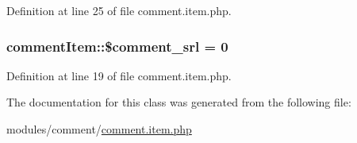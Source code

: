 Definition at line 25 of file comment.\-item.\-php.

\hypertarget{classcommentItem_aec6b057a6e1e71a7b1441fe12682af3b}{
\subsubsection[{\$comment\-\_\-srl}]{\setlength{\rightskip}{0pt plus 5cm}comment\-Item\-::\$comment\-\_\-srl = 0}}\label{classcommentItem_aec6b057a6e1e71a7b1441fe12682af3b}


Definition at line 19 of file comment.\-item.\-php.



The documentation for this class was generated from the following file\-:\begin{DoxyCompactItemize}
\item 
modules/comment/\hyperlink{comment_8item_8php}{comment.\-item.\-php}\end{DoxyCompactItemize}
